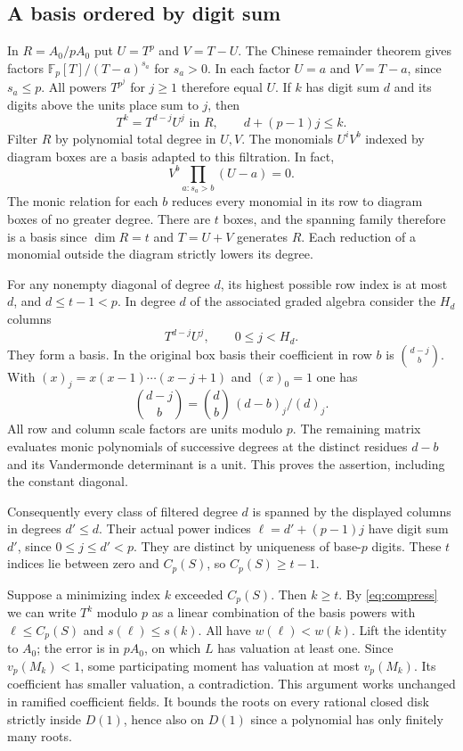 \documentclass[11pt]{article}
\newcommand{\F}{\mathbb F}
\newcommand{\ord}{v_p}
\begin{document}
\subsection*{A basis ordered by digit sum}
In $R=A_0/pA_0$ put $U=T^p$ and $V=T-U$. The Chinese remainder theorem gives factors $\F_p[T]/(T-a)^{s_a}$ for $s_a>0$. In each factor $U=a$ and $V=T-a$, since $s_a\le p$. All powers $T^{p^j}$ for $j\ge1$ therefore equal $U$. If $k$ has digit sum $d$ and its digits above the units place sum to $j$, then
\begin{equation}\label{eq:compress}
 T^k=T^{d-j} U^j \text{ in }R,\qquad d+(p-1)j\le k .
\end{equation}
Filter $R$ by polynomial total degree in $U,V$. The monomials $U^iV^b$ indexed by diagram boxes are a basis adapted to this filtration. In fact,
\[
 V^b\prod_{a:s_a>b}(U-a)=0 .
\]
The monic relation for each $b$ reduces every monomial in its row to diagram boxes of no greater degree. There are $t$ boxes, and the spanning family therefore is a basis since $\dim R=t$ and $T=U+V$ generates $R$. Each reduction of a monomial outside the diagram strictly lowers its degree.

For any nonempty diagonal of degree $d$, its highest possible row index is at most $d$, and $d\le t-1<p$. In degree $d$ of the associated graded algebra consider the $H_d$ columns
\[
 T^{d-j} U^j,\qquad 0\le j<H_d .
\]
They form a basis. In the original box basis their coefficient in row $b$ is $\binom{d-j}{b}$. With $(x)_j=x(x-1)\cdots(x-j+1)$ and $(x)_0=1$ one has
\[
 \binom{d-j}{b}=\binom db\,(d-b)_j/(d)_j .
\]
All row and column scale factors are units modulo $p$. The remaining matrix evaluates monic polynomials of successive degrees at the distinct residues $d-b$ and its Vandermonde determinant is a unit. This proves the assertion, including the constant diagonal.

Consequently every class of filtered degree $d$ is spanned by the displayed columns in degrees $d'\le d$. Their actual power indices $\ell=d'+(p-1)j$ have digit sum $d'$, since $0\le j\le d'<p$. They are distinct by uniqueness of base-$p$ digits. These $t$ indices lie between zero and $C_p(S)$, so $C_p(S)\ge t-1$.

Suppose a minimizing index $k$ exceeded $C_p(S)$. Then $k\ge t$. By \eqref{eq:compress} we can write $T^k$ modulo $p$ as a linear combination of the basis powers with $\ell\le C_p(S)$ and $s(\ell)\le s(k)$. All have $w(\ell)<w(k)$. Lift the identity to $A_0$; the error is in $p A_0$, on which $L$ has valuation at least one. Since $\ord(M_k)<1$, some participating moment has valuation at most $\ord(M_k)$. Its coefficient has smaller valuation, a contradiction. This argument works unchanged in ramified coefficient fields. It bounds the roots on every rational closed disk strictly inside $D(1)$, hence also on $D(1)$ since a polynomial has only finitely many roots.
\end{document}
